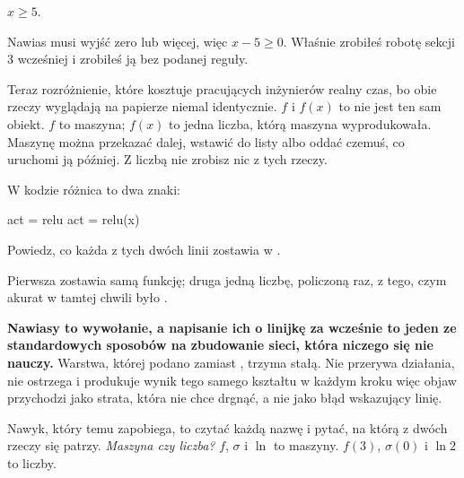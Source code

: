 \begin{fr}
\begin{ansblock}
$x \ge 5$.
\end{ansblock}

Nawias musi wyjść zero lub więcej, więc $x - 5 \ge 0$. Właśnie zrobiłeś robotę
sekcji 3 wcześniej i zrobiłeś ją bez podanej reguły.

Teraz rozróżnienie, które kosztuje pracujących inżynierów realny czas, bo obie
rzeczy wyglądają na papierze niemal identycznie. $f$ i $f(x)$ to nie jest ten
sam obiekt. $f$ to maszyna; $f(x)$ to jedna liczba, którą maszyna wyprodukowała.
Maszynę można przekazać dalej, wstawić do listy albo oddać czemuś, co uruchomi
ją później. Z liczbą nie zrobisz nic z tych rzeczy.

W kodzie różnica to dwa znaki:

\begin{python}
act = relu
act = relu(x)
\end{python}

Powiedz, co każda z tych dwóch linii zostawia w .
\nextframe
\end{fr}

\begin{fr}
\begin{ansblock}
Pierwsza zostawia samą funkcję; druga jedną liczbę, policzoną raz, z tego, czym
akurat w tamtej chwili było .
\end{ansblock}

\begin{trapbox}
\textbf{Nawiasy to wywołanie, a napisanie ich o linijkę za wcześnie to jeden ze
standardowych sposobów na zbudowanie sieci, która niczego się nie nauczy.}
Warstwa, której podano  zamiast , trzyma stałą. Nie
przerywa działania, nie ostrzega i produkuje wynik tego samego kształtu w
każdym kroku \dash{} więc objaw przychodzi jako strata, która nie chce drgnąć,
a nie jako błąd wskazujący linię.

Nawyk, który temu zapobiega, to czytać każdą nazwę i pytać, na którą z dwóch
rzeczy się patrzy. \emph{Maszyna czy liczba?} $f$, $\sigma$ i $\ln$ to
maszyny. $f(3)$, $\sigma(0)$ i $\ln 2$ to liczby.
\end{trapbox}
\end{fr}


